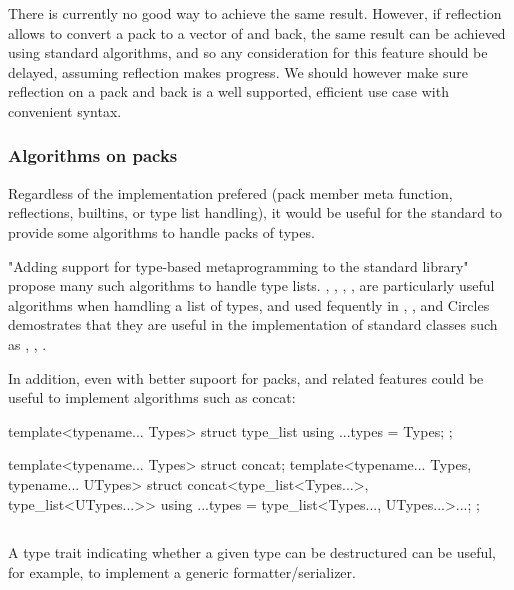 \documentclass{wg21}
\begin{document}
There is currently no good way to achieve the same result.
However, if reflection allows to convert a pack to a vector of  and back, the same result can be achieved using standard algorithms, and so any consideration for this feature should be delayed, assuming reflection makes progress.
We should however make sure reflection on a pack and back is a well supported, efficient use case with convenient syntax.

\subsubsection{Algorithms on packs}
\label{sec:algorithms}


Regardless of the implementation prefered (pack member meta function, reflections, builtins, or type list handling), it would be useful for the standard to provide some algorithms to handle packs of types.

 "Adding support for type-based metaprogramming to the standard library" propose many such algorithms to handle type lists.
, , , ,  are particularly useful algorithms when hamdling a list of types, and used fequently in
, , and Circles demostrates that they are useful in the implementation of standard classes such as , , .

In addition, even with better supoort for packs,  and related features could be useful to implement algorithms such as concat:

\begin{colorblock}
    template<typename... Types>
    struct type_list{
        using ...types = Types;
    };

    template<typename... Types>
    struct concat;
    template<typename... Types, typename... UTypes>
    struct concat<type_list<Types...>, type_list<UTypes...>> {
        using ...types = type_list<Types..., UTypes...>...;
    };
\end{colorblock}

\subsection{}
\label{sec:is_structured_type}

A type trait indicating whether a given type can be destructured can be useful, for example, to implement a generic
formatter/serializer.
\end{document}
